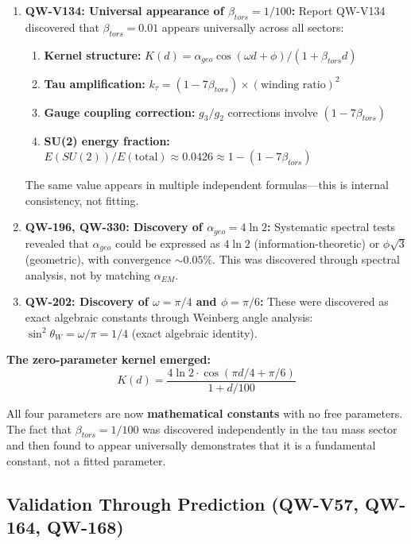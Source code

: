 \documentclass[11pt, a4paper]{article}
\begin{document}
\begin{enumerate}
    \item \textbf{QW-V134: Universal appearance of $\beta_{tors} = 1/100$:} Report QW-V134 discovered that $\beta_{tors} = 0.01$ appears universally across all sectors:
    \begin{enumerate}
        \item \textbf{Kernel structure:} $K(d) = \alpha_{geo} \cos(\omega d + \phi)/(1 + \beta_{tors} d)$
        \item \textbf{Tau amplification:} $k_\tau = (1 - 7\beta_{tors}) \times (\text{winding ratio})^2$
        \item \textbf{Gauge coupling correction:} $g_3/g_2$ corrections involve $(1 - 7\beta_{tors})$
        \item \textbf{SU(2) energy fraction:} $E(SU(2))/E(\text{total}) \approx 0.0426 \approx 1 - (1 - 7\beta_{tors})$
    \end{enumerate}
    The same value appears in multiple independent formulas—this is internal consistency, not fitting.

    \item \textbf{QW-196, QW-330: Discovery of $\alpha_{geo} = 4\ln 2$:} Systematic spectral tests revealed that $\alpha_{geo}$ could be expressed as $4\ln 2$ (information-theoretic) or $\phi\sqrt{3}$ (geometric), with convergence $\sim 0.05\%$. This was discovered through spectral analysis, not by matching $\alpha_{EM}$.

    \item \textbf{QW-202: Discovery of $\omega = \pi/4$ and $\phi = \pi/6$:} These were discovered as exact algebraic constants through Weinberg angle analysis: $\sin^2 \theta_W = \omega/\pi = 1/4$ (exact algebraic identity).
\end{enumerate}

\textbf{The zero-parameter kernel emerged:}
\begin{equation}
K(d) = \frac{4\ln 2 \cdot \cos(\pi d/4 + \pi/6)}{1 + d/100}
\end{equation}

All four parameters are now \textbf{mathematical constants} with no free parameters. The fact that $\beta_{tors} = 1/100$ was discovered independently in the tau mass sector and then found to appear universally demonstrates that it is a fundamental constant, not a fitted parameter.

\subsection{Validation Through Prediction (QW-V57, QW-164, QW-168)}
\end{document}
